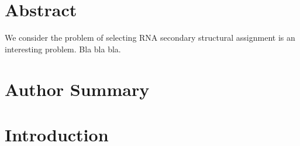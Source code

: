\documentclass[10pt,letterpaper]{article}
\begin{document}
\section*{Abstract}

We consider the problem of selecting 
RNA secondary structural assignment is an interesting problem. Bla bla bla.



\section*{Author Summary}

\linenumbers

\section*{Introduction}


\end{document}
